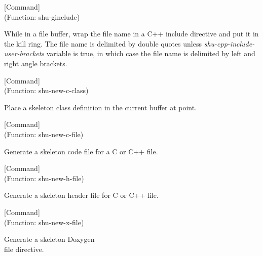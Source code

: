 \vspace{1em}
\noindent
{}
\usebox{\funcname}
 \hfill [Command]\\%
 (Function: shu-ginclude)

\begin{doc-string}
While in a file buffer, wrap the file name in a C++ include directive and
put it in the kill ring.  The file name is delimited by double quotes unless
\emph{shu-cpp-include-user-brackets} variable is true, in which case the file name
is delimited by left and right angle brackets.
\end{doc-string}

\vspace{1em}
\noindent
{}
\usebox{\funcname}
 \hfill [Command]\\%
 (Function: shu-new-c-class)

\begin{doc-string}
Place a skeleton class definition in the current buffer at point.
\end{doc-string}

\vspace{1em}
\noindent
{}
\usebox{\funcname}
 \hfill [Command]\\%
 (Function: shu-new-c-file)

\begin{doc-string}
Generate a skeleton code file for a C or C++ file.
\end{doc-string}

\vspace{1em}
\noindent
{}
\usebox{\funcname}
 \hfill [Command]\\%
 (Function: shu-new-h-file)

\begin{doc-string}
Generate a skeleton header file for C or C++ file.
\end{doc-string}

\vspace{1em}
\noindent
{}
\usebox{\funcname}
 \hfill [Command]\\%
 (Function: shu-new-x-file)

\begin{doc-string}
Generate a skeleton Doxygen \\file directive.
\end{doc-string}

